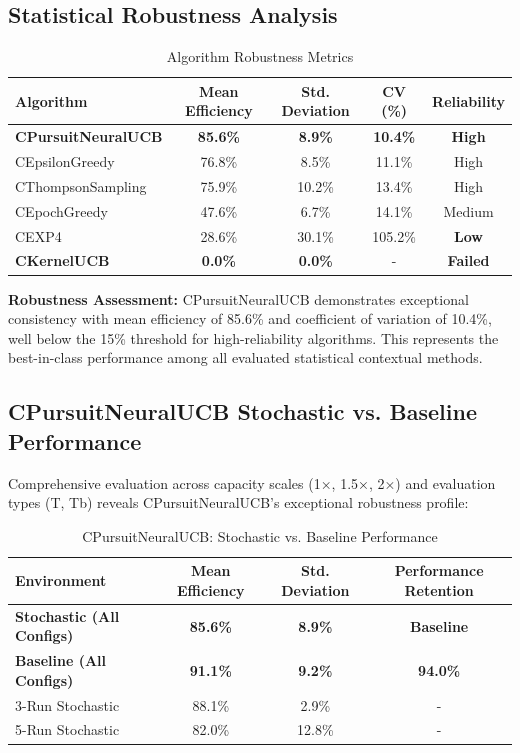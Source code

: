 \documentclass[12pt,a4paper]{article}
\newcommand{\success}[1]{\textcolor{accentgreen}{\textbf{#1}}}
\newcommand{\warning}[1]{\textcolor{warningred}{\textbf{#1}}}
\begin{document}
\subsection{Statistical Robustness Analysis}

\begin{table}[H]
\centering
\caption{Algorithm Robustness Metrics}
\begin{tabular}{@{}lcccc@{}}
\toprule
\textbf{Algorithm} & \textbf{Mean Efficiency} & \textbf{Std. Deviation} & \textbf{CV (\%)} & \textbf{Reliability} \\
\midrule
\success{CPursuitNeuralUCB} & \success{85.6\%} & \success{8.9\%} & \success{10.4\%} & \success{High} \\
CEpsilonGreedy & 76.8\% & 8.5\% & 11.1\% & High \\
CThompsonSampling & 75.9\% & 10.2\% & 13.4\% & High \\
CEpochGreedy & 47.6\% & 6.7\% & 14.1\% & Medium \\
CEXP4 & 28.6\% & 30.1\% & 105.2\% & \warning{Low} \\
\warning{CKernelUCB} & \warning{0.0\%} & \warning{0.0\%} & - & \warning{Failed} \\
\bottomrule
\end{tabular}
\end{table}

\textbf{Robustness Assessment:} CPursuitNeuralUCB demonstrates exceptional consistency with mean efficiency of 85.6\% and coefficient of variation of 10.4\%, well below the 15\% threshold for high-reliability algorithms. This represents the best-in-class performance among all evaluated statistical contextual methods.

\subsection{CPursuitNeuralUCB Stochastic vs. Baseline Performance}

Comprehensive evaluation across capacity scales (1×, 1.5×, 2×) and evaluation types (T, Tb) reveals CPursuitNeuralUCB's exceptional robustness profile:

\begin{table}[H]
\centering
\caption{CPursuitNeuralUCB: Stochastic vs. Baseline Performance}
\begin{tabular}{@{}lccc@{}}
\toprule
\textbf{Environment} & \textbf{Mean Efficiency} & \textbf{Std. Deviation} & \textbf{Performance Retention} \\
\midrule
\success{Stochastic (All Configs)} & \success{85.6\%} & \success{8.9\%} & \success{Baseline} \\
\success{Baseline (All Configs)} & \success{91.1\%} & \success{9.2\%} & \success{94.0\%} \\
\midrule
3-Run Stochastic & 88.1\% & 2.9\% & - \\
5-Run Stochastic & 82.0\% & 12.8\% & - \\
\bottomrule
\end{tabular}
\end{table}
\end{document}
